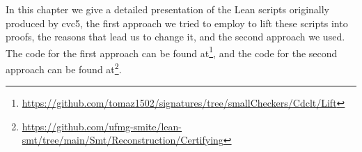 In this chapter we give a detailed presentation of the Lean scripts originally produced by cvc5, the first approach we tried to employ to lift these scripts into proofs, the reasons that lead us to change it, and the second approach we used. The code for the first approach can be found at\footnote{\url{https://github.com/tomaz1502/signatures/tree/smallCheckers/Cdclt/Lift}}, and the code for the second approach can be found at\footnote{\url{https://github.com/ufmg-smite/lean-smt/tree/main/Smt/Reconstruction/Certifying}}.
